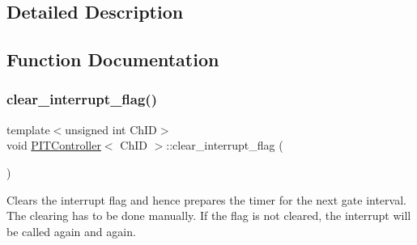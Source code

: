\subsection{Detailed Description}


\subsection{Function Documentation}
\mbox{\label{group__Interrupt_gae3f9c981e88cced34153234475de5646}} 
\subsubsection{\texorpdfstring{clear\+\_\+interrupt\+\_\+flag()}{clear\_interrupt\_flag()}}
{\footnotesize\ttfamily template$<$unsigned int Ch\+ID$>$ \\
void \hyperlink{classPITController}{P\+I\+T\+Controller}$<$ Ch\+ID $>$\+::clear\+\_\+interrupt\+\_\+flag (\begin{DoxyParamCaption}{ }\end{DoxyParamCaption})\hspace{0.3cm}{\ttfamily [inline]}}



Clears the interrupt flag and hence prepares the timer for the next gate interval. The clearing has to be done manually. If the flag is not cleared, the interrupt will be called again and again. 

\mbox{\label{group__Interrupt_gaf1a21e0b3f9a57e247aa40c457e15ee3}} 
